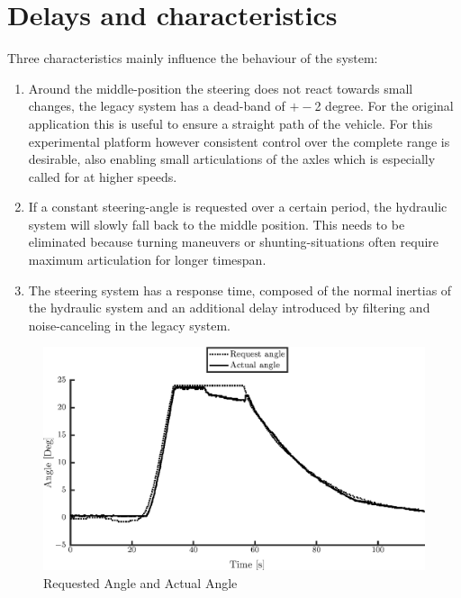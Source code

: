 \documentclass[root.tex]{subfiles}
\begin{document}
	
	{\pagestyle{empty}}
	\section{Delays and characteristics}
	\label{chap:Delays}
	
	Three characteristics mainly influence the behaviour of the system: 
	
	\begin{enumerate}
		\item Around the middle-position the steering does not react towards small changes, the legacy system has a dead-band of $+-$2 degree. For the original application this is useful to ensure a straight path of the vehicle. For this experimental platform however consistent control over the complete range is desirable, also enabling small articulations of the axles which is especially called for at higher speeds. 
		\item If a constant steering-angle is requested over a certain period, the hydraulic system will slowly fall back to the middle position. This needs to be eliminated because turning maneuvers or shunting-situations often require maximum articulation for longer timespan.
		\item The steering system has a response time, composed of the normal inertias of the hydraulic system and an additional delay introduced by filtering and noise-canceling in the legacy system. 
		
	\end{enumerate}
	
	\begin{figure}[!h]
		
		\includegraphics[width=1\linewidth]{front}
		\caption[Requested Angle and Actual Angle]{Requested Angle and Actual Angle}
		
		\label{fig:Constant_request}
	\end{figure}
	
\end{document}
